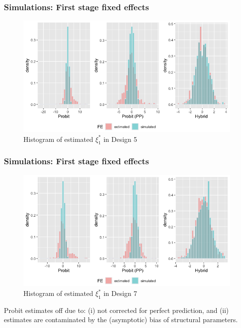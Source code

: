 \begin{frame}
    \frametitle{Simulations: First stage fixed effects}
    \begin{figure}
        \centerline{\includegraphics[scale=.35]{content/Figures/Hist_FE_Design5.png}}
        \caption{\footnotesize{Histogram of estimated $\xi_1^*$ in Design 5}}
        \label{fig}
      \end{figure}
\end{frame}

\begin{frame}
    \frametitle{Simulations: First stage fixed effects}
    \begin{figure}
        \centerline{\includegraphics[scale=.35]{content/Figures/Hist_FE_Design7.png}}
        \caption{\footnotesize{Histogram of estimated $\xi_1^*$ in Design 7}}
        \label{fig}
      \end{figure}
      Probit estimates off due to: (i) not corrected for perfect prediction, and (ii) estimates are contaminated by the (asymptotic) bias of structural parameters.
      \hyperlink{single indices}{}
\end{frame}

